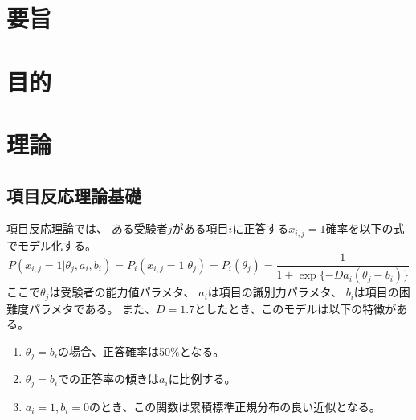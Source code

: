\documentclass[12pt]{jarticle}
\begin{document}



\section{要旨}
\section{目的}

\section{理論}
\subsection{項目反応理論基礎}
項目反応理論では、
ある受験者$j$がある項目$i$に正答する$x_{i,j}=1$確率を以下の式でモデル化する。
\begin{equation}
    P(x_{i,j}=1|\theta_j,a_i,b_i)=P_i(x_{i,j}=1|\theta_j)=P_i(\theta_j)=\frac{1}{1+\exp\{-Da_i(\theta_j -b_i)\}}
\end{equation}
ここで$\theta_j$は受験者の能力値パラメタ、
$a_i$は項目の識別力パラメタ、
$b_i$は項目の困難度パラメタである。
また、$D=1.7$としたとき、このモデルは以下の特徴がある。
\begin{enumerate}
    \item $\theta_j=b_i$の場合、正答確率は50$\%$となる。
    \item $\theta_j=b_i$での正答率の傾きは$a_i$に比例する。
    \item $a_i=1,b_i=0$のとき、この関数は累積標準正規分布の良い近似となる。
\end{enumerate}
\end{document}
